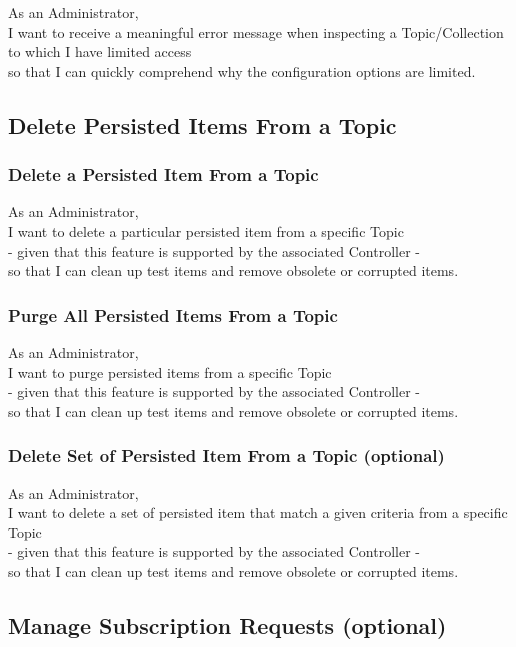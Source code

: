 As an Administrator,\\
I want to receive a meaningful error message when inspecting a Topic/Collection to which I have limited access \\
so that I can quickly comprehend why the configuration options are limited.

\subsection{Delete Persisted Items From a Topic}

\subsubsection{Delete a Persisted Item From a Topic}

As an Administrator,\\
I want to delete a particular persisted item from a specific Topic\\
- given that this feature is supported by the associated Controller -\\
so that I can clean up test items and remove obsolete or corrupted items.

\subsubsection{Purge All Persisted Items From a Topic}

As an Administrator,\\
I want to purge persisted items from a specific Topic\\
- given that this feature is supported by the associated Controller -\\
so that I can clean up test items and remove obsolete or corrupted items.

\subsubsection{Delete Set of Persisted Item From a Topic (optional)}

As an Administrator,\\
I want to delete a set of persisted item that match a given criteria from a specific Topic\\
- given that this feature is supported by the associated Controller -\\
so that I can clean up test items and remove obsolete or corrupted items.

\subsection{Manage Subscription Requests (optional)}

